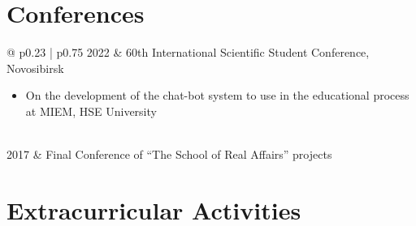 \documentclass[12pt, a4paper]{extarticle}
\begin{document}
\section*{Conferences}

\begin{tabular}{ @{\hskip 0pt} p{0.23\textwidth} | p{0.75\textwidth} }
    2022 & 60th International Scientific Student Conference, Novosibirsk \newline 
    \begin{minipage}[t]{\linewidth}
        \begin{itemize}[nosep,after=\strut]
            \item On the development of the chat-bot system to use in the educational process at MIEM, HSE University
        \end{itemize}
    \end{minipage} \\
    2017 & Final Conference of ``The School of Real Affairs'' projects  \\
\end{tabular}

\section*{Extracurricular Activities}
\end{document}
